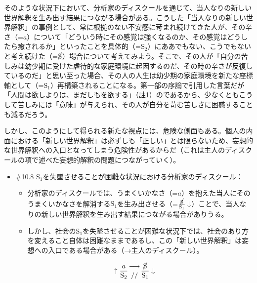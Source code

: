 そのような状況下において、\mbox{分析家のディスクール}を通じて、当人なりの新しい世界解釈を生み出す結果につながる場合がある。こうした「当人なりの新しい世界解釈」の事例として、常に根拠のない不安感に苛まれ続けてきた人が、その辛さ（=\(a\)）について「どういう時にその感覚は強くなるのか、その感覚はどうしたら癒されるか」といったことを具体的（=\(\textrm{S}_2\)）にああでもない、こうでもないと考え続けた（=\(\cancel{\textrm{S}}\)）場合について考えてみよう。そこで、その人が「自分の苦しみは幼少期に受けた虐待的な家庭環境に起因するのだ、その時の辛さが反復しているのだ」と思い至った場合、その人の人生は幼少期の家庭環境を新たな座標軸として（=\(\textrm{S}_1\)）再構築されることになる。第一部の序論で引用した言葉だが「人間は欲しよりは、まだしもを欲する」（註1）のであるから、少なくともこうして苦しみには「意味」が与えられ、その人が自分を苛む苦しさに困惑することも減るだろう。

しかし、このようにして得られる新たな視点には、危険な側面もある。個人の内面における「新しい世界解釈」は必ずしも「正しい」とは限らないため、妄想的な世界解釈への入口となってしまう危険性があるからだ（これは\mbox{主人のディスクール}の項で述べた妄想的解釈の問題につながっていく）。

\begin{note}{}
  \begin{itemize}
    \tightlist
    \item{\#10.8}
      $\textrm{S}_1$を失墜させることが困難な状況における\mbox{分析家のディスクール}：
      \begin{itemize}
          \tightlist
          \item
          \mbox{分析家のディスクール}では、うまくいかなさ（=$a$）を抱えた当人にそのうまくいかなさを解消する$\textrm{S}_1$を生み出させる（=$\frac{\cancel{\textrm{S}}}{\textrm{S}_1}\downarrow$）ことで、当人なりの新しい世界解釈を生み出す結果につながる場合がありうる。
          \item
          しかし、社会の$\textrm{S}_1$を失墜させることが困難な状況下では、社会のあり方を変えること自体は困難なままであるし、この「新しい世界解釈」は妄想への入口である場合がある（→\mbox{主人のディスクール}）。
        \end{itemize}

$$
\uparrow\frac{a}{\mathrm{S_2}}\genfrac{}{}{0pt}{}{\longrightarrow}{//}\frac{\cancel{\textrm{S}}}{\mathrm{S_1}}\downarrow
$$
  \end{itemize}
\end{note}

